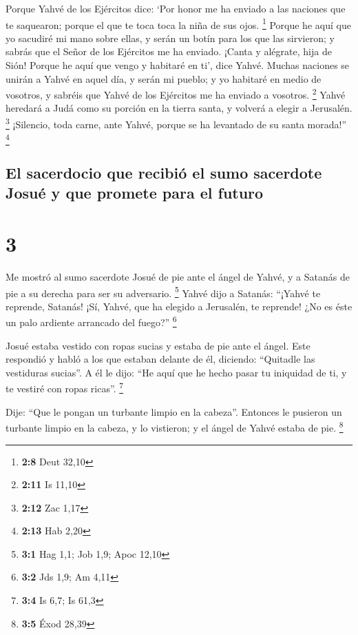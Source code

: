  Porque Yahvé de los Ejércitos dice: `Por honor me ha
enviado a las naciones que te saquearon; porque el que te toca toca la
niña de sus ojos. \footnote{\textbf{2:8} Deut 32,10} 
Porque he aquí que yo sacudiré mi mano sobre ellas, y serán un botín
para los que las sirvieron; y sabrás que el Señor de los Ejércitos me ha
enviado.  ¡Canta y alégrate, hija de Sión! Porque he aquí
que vengo y habitaré en ti', dice Yahvé.  Muchas naciones
se unirán a Yahvé en aquel día, y serán mi pueblo; y yo habitaré en
medio de vosotros, y sabréis que Yahvé de los Ejércitos me ha enviado a
vosotros. \footnote{\textbf{2:11} Is 11,10}  Yahvé
heredará a Judá como su porción en la tierra santa, y volverá a elegir a
Jerusalén. \footnote{\textbf{2:12} Zac 1,17}  ¡Silencio,
toda carne, ante Yahvé, porque se ha levantado de su santa morada!''
\footnote{\textbf{2:13} Hab 2,20}

\hypertarget{el-sacerdocio-que-recibiuxf3-el-sumo-sacerdote-josuuxe9-y-que-promete-para-el-futuro}{%
\subsection{El sacerdocio que recibió el sumo sacerdote Josué y que
promete para el
futuro}\label{el-sacerdocio-que-recibiuxf3-el-sumo-sacerdote-josuuxe9-y-que-promete-para-el-futuro}}

\hypertarget{section-2}{%
\section{3}\label{section-2}}

 Me mostró al sumo sacerdote Josué de pie ante el ángel de
Yahvé, y a Satanás de pie a su derecha para ser su adversario.
\footnote{\textbf{3:1} Hag 1,1; Job 1,9; Apoc 12,10} 
Yahvé dijo a Satanás: ``¡Yahvé te reprende, Satanás! ¡Sí, Yahvé, que ha
elegido a Jerusalén, te reprende! ¿No es éste un palo ardiente arrancado
del fuego?'' \footnote{\textbf{3:2} Jds 1,9; Am 4,11}

 Josué estaba vestido con ropas sucias y estaba de pie
ante el ángel.  Este respondió y habló a los que estaban
delante de él, diciendo: ``Quitadle las vestiduras sucias''. A él le
dijo: ``He aquí que he hecho pasar tu iniquidad de ti, y te vestiré con
ropas ricas''. \footnote{\textbf{3:4} Is 6,7; Is 61,3}

 Dije: ``Que le pongan un turbante limpio en la cabeza''.
Entonces le pusieron un turbante limpio en la cabeza, y lo vistieron; y
el ángel de Yahvé estaba de pie. \footnote{\textbf{3:5} Éxod 28,39}

